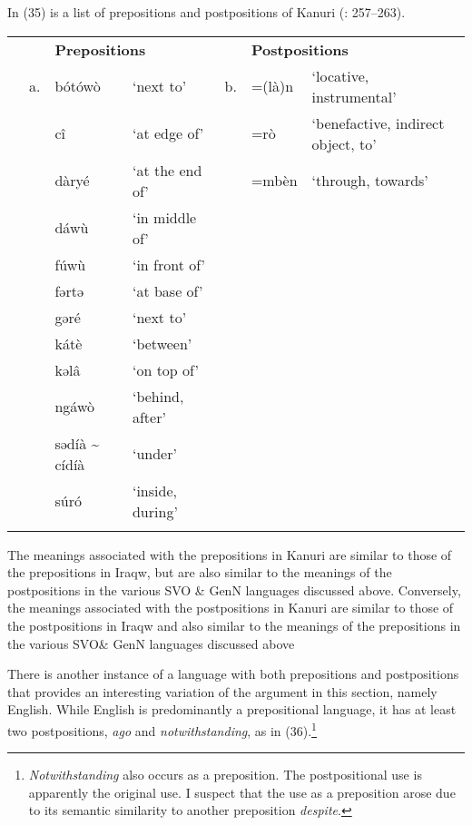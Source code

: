 \documentclass[output=paper]{langsci/langscibook}
\begin{document}
In (35) is a list of prepositions and postpositions of Kanuri (\citealt{Hutchison1981}: 257–263).


\begin{table}
\begin{tabularx}{\textwidth}{XXXXXXX} 
\lsptoprule
&  & \multicolumn{2}{X}{\bfseries Prepositions} &  & \multicolumn{2}{X}{\bfseries Postpositions}\\
& a. & bótówò & ‘next to’ & b. & =(là)n & ‘locative, instrumental’\\
&  & cî & ‘at edge of’ &  & =rò & ‘benefactive, indirect object, to’\\
&  & dàryé & ‘at the end of’ &  & =mbèn & ‘through, towards’\\
&  & dáwù & ‘in middle of’ &  &  & \\
&  & fúwù & ‘in front of’ &  &  & \\
&  & fərtə & ‘at base of’ &  &  & \\
&  & gəré & ‘next to’ &  &  & \\
&  & kátè & ‘between’ &  &  & \\
&  & kəlâ & ‘on top of’ &  &  & \\
&  & ngáwò & ‘behind, after’ &  &  & \\
&  & sədíà {\textasciitilde} cídíà & ‘under’ &  &  & \\
&  & súró & ‘inside, during’ &  &  & \\
\lspbottomrule
\end{tabularx}
\end{table}

The meanings associated with the prepositions in Kanuri are similar to those of the prepositions in Iraqw, but are also similar to the meanings of the postpositions in the various SVO \& GenN languages discussed above. Conversely, the meanings associated with the postpositions in Kanuri are similar to those of the postpositions in Iraqw and also similar to the meanings of the prepositions in the various SVO\& GenN languages discussed above

There is another instance of a language with both prepositions and postpositions that provides an interesting variation of the argument in this section, namely English. While English is predominantly a prepositional language, it has at least two postpositions, \textit{ago} and \textit{notwithstanding}, as in (36).\footnote{\textit{Notwithstanding} also occurs as a preposition. The postpositional use is apparently the original use. I suspect that the use as a preposition arose due to its semantic similarity to another preposition \textit{despite}.}
\end{document}
